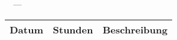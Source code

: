             
\begin{LARGE}
\trtimesheet~\invoiceperiodbegin~---~\invoiceperiodend
\end{LARGE}

\begin{longtable}{p{4cm}p{2cm}p{9cm}}
    \textbf{Datum} & \textbf{Stunden} & \textbf{Beschreibung} \\
	\hline

\end{longtable}